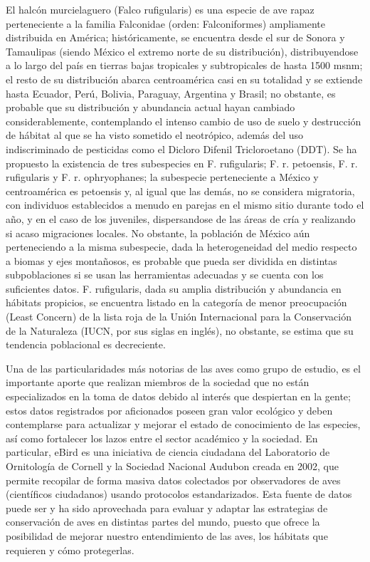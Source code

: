 \documentclass[
]{article}
\begin{document}
El halcón murcielaguero (Falco rufigularis) es una especie de ave rapaz
perteneciente a la familia Falconidae (orden: Falconiformes) ampliamente
distribuida en América; históricamente, se encuentra desde el sur de
Sonora y Tamaulipas (siendo México el extremo norte de su distribución),
distribuyendose a lo largo del país en tierras bajas tropicales y
subtropicales de hasta 1500 msnm; el resto de su distribución abarca
centroamérica casi en su totalidad y se extiende hasta Ecuador, Perú,
Bolivia, Paraguay, Argentina y Brasil; no obstante, es probable que su
distribución y abundancia actual hayan cambiado considerablemente,
contemplando el intenso cambio de uso de suelo y destrucción de hábitat
al que se ha visto sometido el neotrópico, además del uso indiscriminado
de pesticidas como el Dicloro Difenil Tricloroetano (DDT). Se ha
propuesto la existencia de tres subespecies en F. rufigularis; F. r.
petoensis, F. r. rufigularis y F. r. ophryophanes; la subespecie
perteneciente a México y centroamérica es petoensis y, al igual que las
demás, no se considera migratoria, con individuos establecidos a menudo
en parejas en el mismo sitio durante todo el año, y en el caso de los
juveniles, dispersandose de las áreas de cría y realizando si acaso
migraciones locales. No obstante, la población de México aún
perteneciendo a la misma subespecie, dada la heterogeneidad del medio
respecto a biomas y ejes montañosos, es probable que pueda ser dividida
en distintas subpoblaciones si se usan las herramientas adecuadas y se
cuenta con los suficientes datos. F. rufigularis, dada su amplia
distribución y abundancia en hábitats propicios, se encuentra listado en
la categoría de menor preocupación (Least Concern) de la lista roja de
la Unión Internacional para la Conservación de la Naturaleza (IUCN, por
sus siglas en inglés), no obstante, se estima que su tendencia
poblacional es decreciente.

Una de las particularidades más notorias de las aves como grupo de
estudio, es el importante aporte que realizan miembros de la sociedad
que no están especializados en la toma de datos debido al interés que
despiertan en la gente; estos datos registrados por aficionados poseen
gran valor ecológico y deben contemplarse para actualizar y mejorar el
estado de conocimiento de las especies, así como fortalecer los lazos
entre el sector académico y la sociedad. En particular, eBird es una
iniciativa de ciencia ciudadana del Laboratorio de Ornitología de
Cornell y la Sociedad Nacional Audubon creada en 2002, que permite
recopilar de forma masiva datos colectados por observadores de aves
(científicos ciudadanos) usando protocolos estandarizados. Esta fuente
de datos puede ser y ha sido aprovechada para evaluar y adaptar las
estrategias de conservación de aves en distintas partes del mundo,
puesto que ofrece la posibilidad de mejorar nuestro entendimiento de las
aves, los hábitats que requieren y cómo protegerlas.
\end{document}
